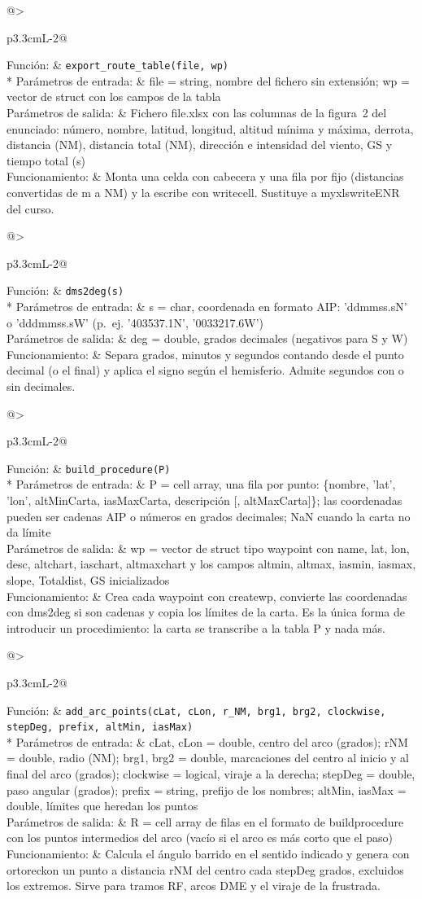 \documentclass[11pt,a4paper]{article}
\makeatletter
\newcommand{\funcion}[4]{\par\Needspace{8\baselineskip}\begingroup\setlength{\LTleft}{0pt}\setlength{\LTright}{0pt}%
\setlength{\LTpre}{2mm}\setlength{\LTpost}{3mm}%
\begin{longtable}{@{}>{\bfseries\raggedright\arraybackslash}p{3.3cm}L{\dimexpr\linewidth-3.3cm-2\tabcolsep\relax}@{}}\toprule
Función: & \texttt{#1}\\* \midrule
Parámetros de entrada: & #2\\ \midrule
Parámetros de salida: & #3\\ \midrule
Funcionamiento: & #4\\ \bottomrule
\end{longtable}\addtocounter{table}{-1}\endgroup}
\DeclareRobustCommand{\m}[1]{{\ttfamily\def\_{\textunderscore\penalty100\relax}#1}}
\makeatother
\begin{document}
\funcion{export\_route\_table(file, wp)}
{\m{file} = string, nombre del fichero sin extensión; \m{wp} = vector de struct con los campos de la tabla}
{Fichero \m{file.xlsx} con las columnas de la figura~2 del enunciado: número, nombre, latitud, longitud, altitud mínima y máxima, derrota, distancia (NM), distancia total (NM), dirección e intensidad del viento, GS y tiempo total (s)}
{Monta una celda con cabecera y una fila por fijo (distancias convertidas de m a NM) y la escribe con \m{writecell}. Sustituye a \m{myxlswrite\_ENR} del curso.}

\funcion{dms2deg(s)}
{\m{s} = char, coordenada en formato AIP: 'ddmmss.sN' o 'dddmmss.sW' (p.~ej. '403537.1N', '0033217.6W')}
{\m{deg} = double, grados decimales (negativos para S y W)}
{Separa grados, minutos y segundos contando desde el punto decimal (o el final) y aplica el signo según el hemisferio. Admite segundos con o sin decimales.}

\funcion{build\_procedure(P)}
{\m{P} = cell array, una fila por punto: \{nombre, 'lat', 'lon', altMinCarta, iasMaxCarta, descripción [, altMaxCarta]\}; las coordenadas pueden ser cadenas AIP o números en grados decimales; NaN cuando la carta no da límite}
{\m{wp} = vector de struct tipo waypoint con name, lat, lon, desc, \m{alt\_chart}, \m{ias\_chart}, \m{alt\_max\_chart} y los campos \m{alt\_min}, \m{alt\_max}, \m{ias\_min}, \m{ias\_max}, \m{slope}, \m{Total\_dist}, \m{GS} inicializados}
{Crea cada waypoint con \m{create\_wp}, convierte las coordenadas con \m{dms2deg} si son cadenas y copia los límites de la carta. Es la única forma de introducir un procedimiento: la carta se transcribe a la tabla \m{P} y nada más.}

\funcion{add\_arc\_points(cLat, cLon, r\_NM, brg1, brg2, clockwise, stepDeg, prefix, altMin, iasMax)}
{\m{cLat, cLon} = double, centro del arco (grados); \m{r\_NM} = double, radio (NM); \m{brg1, brg2} = double, marcaciones del centro al inicio y al final del arco (grados); \m{clockwise} = logical, viraje a la derecha; \m{stepDeg} = double, paso angular (grados); \m{prefix} = string, prefijo de los nombres; \m{altMin}, \m{iasMax} = double, límites que heredan los puntos}
{\m{R} = cell array de filas en el formato de \m{build\_procedure} con los puntos intermedios del arco (vacío si el arco es más corto que el paso)}
{Calcula el ángulo barrido en el sentido indicado y genera con \m{orto\_reckon} un punto a distancia \m{r\_NM} del centro cada \m{stepDeg} grados, excluidos los extremos. Sirve para tramos RF, arcos DME y el viraje de la frustrada.}
\end{document}
